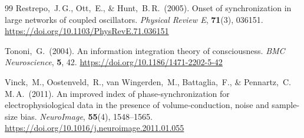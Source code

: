 \documentclass[11pt,a4paper]{article}
\theoremstyle{plain}
\theoremstyle{definition}
\theoremstyle{remark}
\begin{document}
\begin{thebibliography}{99}
Restrepo,~J.\,G., Ott,~E., \& Hunt,~B.\,R.\ (2005).
Onset of synchronization in large networks of coupled oscillators.
\textit{Physical Review E}, \textbf{71}(3), 036151.
\url{https://doi.org/10.1103/PhysRevE.71.036151}


Tononi,~G.\ (2004).
An information integration theory of consciousness.
\textit{BMC Neuroscience}, \textbf{5}, 42.
\url{https://doi.org/10.1186/1471-2202-5-42}

Vinck,~M., Oostenveld,~R., van Wingerden,~M., Battaglia,~F., \& Pennartz,~C.\,M.\,A.\ (2011).
An improved index of phase-synchronization for electrophysiological data in the presence of volume-conduction, noise and sample-size bias.
\textit{NeuroImage}, \textbf{55}(4), 1548--1565.
\url{https://doi.org/10.1016/j.neuroimage.2011.01.055}


\end{thebibliography}
\end{document}
